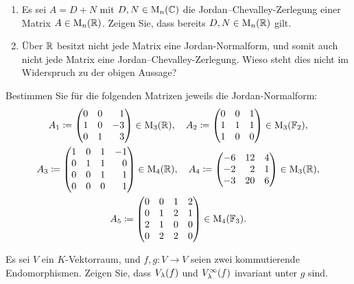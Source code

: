 \documentclass[a4paper, 10pt]{scrartcl}
\begin{document}
\begin{question}
  \begin{enumerate}
    \item
      Es sei $A = D + N$ mit $D, N \in \operatorname{M}_{n}(\mathbb{C})$ die Jordan--Chevalley-Zerlegung einer Matrix $A \in \operatorname{M}_{n}(\mathbb{R})$.
      Zeigen Sie, dass bereits $D, N \in \operatorname{M}_{n}(\mathbb{R})$ gilt.
    \item
      Über $\mathbb{R}$ besitzt nicht jede Matrix eine Jordan-Normalform, und somit auch nicht jede Matrix eine Jordan--Chevalley-Zerlegung.
      Wieso steht dies nicht im Widerspruch zu der obigen Aussage?
  \end{enumerate}
\end{question}





\begin{question}
  Bestimmen Sie für die folgenden Matrizen jeweils die Jordan-Normalform:
  \begin{gather*}
              A_1
    \coloneqq \begin{pmatrix*}[r]
                0 & 0 &  1  \\
                1 & 0 & -3  \\
                0 & 1 &  3
              \end{pmatrix*}
              \in \matrices{3}{\Real},
    \quad
              A_2
    \coloneqq \begin{pmatrix*}[r]
                0 & 0 & 1 \\
                1 & 1 & 1 \\
                1 & 0 & 0
              \end{pmatrix*}
              \in \matrices{3}{\Field_2},
    \\
              A_3
    \coloneqq \begin{pmatrix*}[r]
                1 & 0 & 1 & -1  \\
                0 & 1 & 1 &  0  \\
                0 & 0 & 1 &  1  \\
                0 & 0 & 0 &  1
              \end{pmatrix*}
              \in \matrices{4}{\Real},
    \quad
              A_4
    \coloneqq \begin{pmatrix*}[r]
                -6  & 12  & 4 \\
                -2  &  2  & 1 \\
                -3  & 20  & 6
              \end{pmatrix*}
              \in \matrices{3}{\Real},
    \\
              A_5
    \coloneqq \begin{pmatrix}
                0 & 0 & 1 & 2 \\
                0 & 1 & 2 & 1 \\
                2 & 1 & 0 & 0 \\
                0 & 2 & 2 & 0
              \end{pmatrix}
              \in \matrices{4}{\Field_3}.
  \end{gather*}
\end{question}





\begin{question}
  Es sei $V$ ein $K$-Vektorraum, und $f, g \colon V \to V$ seien zwei kommutierende Endomorphismen.
  Zeigen Sie, dass $V_{\lambda}(f)$ und $V_{\lambda}^{\infty}(f)$ invariant unter $g$ sind.
\end{question}
\end{document}
